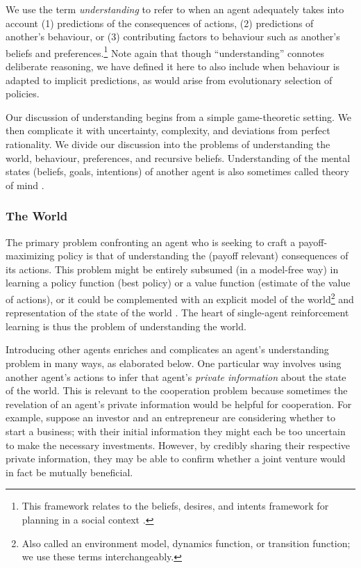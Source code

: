 \documentclass[11pt, a4paper, logo, onecolumn, nonumbering]{deepmind}
\begin{document}
We use the term \textit{understanding} to refer to when an agent adequately takes into account (1) predictions of the consequences of actions, (2) predictions of another's behaviour, or (3) contributing factors to behaviour such as another's beliefs and preferences.\footnote{This framework relates to the beliefs, desires, and intents framework for planning in a social context \cite{bratman1987intention, lee1994prs,d1997formal,huber1999jam,bellifemine2007developing}.}
Note again that though ``understanding'' connotes deliberate reasoning, we have defined it here to also include when behaviour is adapted to implicit predictions, as would arise from evolutionary selection of policies. 

Our discussion of understanding begins from a simple game-theoretic setting. We then complicate it with uncertainty, complexity, and deviations from perfect rationality. We divide our discussion into the problems of understanding the world, behaviour, preferences, and recursive beliefs. Understanding of the mental states (beliefs, goals, intentions) of another agent is also sometimes called theory of mind \cite{baron1985does}. %




\subsubsection{The World}
The primary problem confronting an agent who is seeking to craft a payoff-maximizing policy is that of understanding the (payoff relevant) consequences of its actions. This problem might be entirely subsumed (in a model-free way) in learning a policy function (best policy) or a value function (estimate of the value of actions), or it could be complemented with an explicit model of the world\footnote{Also called an environment model, dynamics function, or transition function; we use these terms interchangeably.} and representation of the state of the world \cite[\S 1]{sutton2020reinforcement}. %
The heart of single-agent reinforcement learning is thus the problem of understanding the world. 

Introducing other agents enriches and complicates an agent's understanding problem in many ways, as elaborated below. One particular way involves using another agent's actions to infer that agent's \textit{private information} about the state of the world. This is relevant to the cooperation problem because sometimes the revelation of an agent's private information would be helpful for cooperation. For example, suppose an investor and an entrepreneur are considering whether to start a business; with their initial information they might each be too uncertain to make the necessary investments. However, by credibly sharing their respective private information, they may be able to confirm whether a joint venture would in fact be mutually beneficial. 
\end{document}
